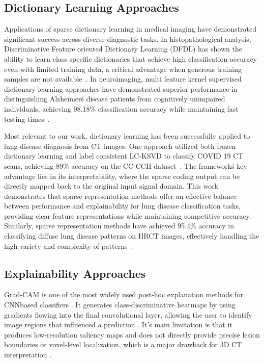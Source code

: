 \subsection{Dictionary Learning Approaches}
Applications of sparse dictionary learning in medical imaging have demonstrated significant success across diverse diagnostic tasks. In histopathological
analysis, Discriminative Feature oriented Dictionary Learning (DFDL) has shown the ability to learn class specific dictionaries that achieve high classification
accuracy even with limited training data, a critical advantage when generous training samples are not available~\cite{vu2016dfdl}. In neuroimaging, multi feature kernel supervised
dictionary learning approaches have demonstrated superior performance in distinguishing Alzheimer\'s disease patients from cognitively unimpaired individuals,
achieving 98.18\% classification accuracy while maintaining fast testing times~\cite{li2018mkscddl}.

Most relevant to our work, dictionary learning has been successfully applied to lung disease diagnosis from CT images. One approach utilized both frozen
dictionary learning and label consistent LC-KSVD to classify COVID 19 CT scans, achieving 89\% accuracy on the CC-CCII dataset~\cite{gould2007nodule}. The framework\'s key
advantage lies in its interpretability, where the sparse coding output can be directly mapped back to the original input signal domain. This work demonstrates that
sparse representation methods offer an effective balance between performance and explainability for lung disease classification tasks, providing clear feature
representations while maintaining competitive accuracy. Similarly, sparse representation methods have achieved 95.4\% accuracy in classifying diffuse lung disease
patterns on HRCT images, effectively handling the high variety and complexity of patterns~\cite{aberle2011nlst}.


\subsection{Explainability Approaches}

Grad-CAM is one of the most widely used post-hoc explanation methods for CNNbased classifiers \cite{selvaraju2017gradcam}. 
It generates class-discriminative heatmaps by using gradients flowing into the final convolutional layer, allowing the user to identify
image regions that influenced a prediction \cite{selvaraju2017gradcam}. 
It's main limitation is that it produces low-resolution saliency maps and does not directly provide precise lesion boundaries or
voxel-level localization, which is a major drawback for 3D CT interpretation \cite{selvaraju2017gradcam,draelos2021usehirescaminsteadgradcam}.


